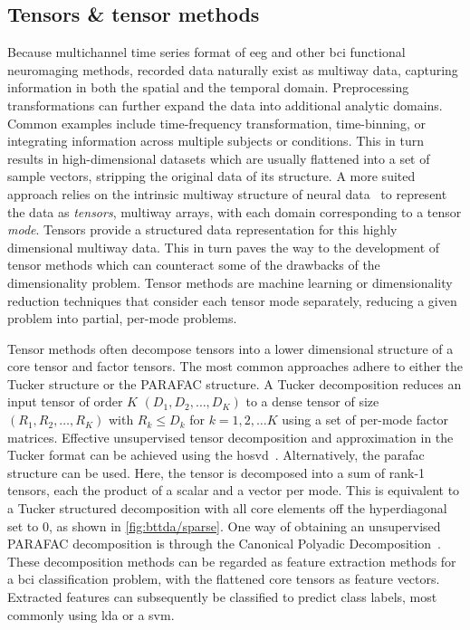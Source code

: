 \documentclass[twocolumn]{article}
\begin{document}
\subsection{Tensors \& tensor methods}

Because multichannel time series format of \ac{eeg} and other \ac{bci} functional
neuromaging methods, recorded data naturally exist as multiway data, capturing
information in both the spatial and the temporal domain.
Preprocessing transformations can further expand the data into additional
analytic domains.
Common examples include time-frequency transformation, time-binning, or
integrating information across multiple subjects or conditions.
This in turn results in high-dimensional datasets which are usually flattened
into a set of sample vectors, stripping the original data of its structure.
A more suited approach relies on the intrinsic multiway structure of neural
data~\cite{Erol2022} to represent the data as \emph{tensors}, multiway arrays,
with each domain corresponding to a tensor \emph{mode}.
Tensors provide a structured data representation for this highly dimensional
multiway data.
This in turn paves the way to the development of tensor methods which can
counteract some of the drawbacks of the dimensionality problem.
Tensor methods are machine learning or dimensionality reduction techniques that
consider each tensor mode separately, reducing a given problem into partial,
per-mode problems.

Tensor methods often decompose tensors into a lower dimensional structure
of a core tensor and factor tensors.
The most common approaches adhere to either the Tucker structure or the PARAFAC
structure.
A Tucker decomposition reduces an input tensor of order $K$  $(D_1,D_2,\ldots,D_K)$ to
a dense tensor of size $(R_1,R_2,\ldots,R_K)$ with $R_k \leq D_k$ for $k=1, 2, \ldots K$ using a
set of per-mode factor matrices.
Effective unsupervised tensor decomposition and approximation in the Tucker format can be achieved
using the \ac{hosvd}~\cite{DeLathauwer2000,SoleCasals2018}.
Alternatively, the \ac{parafac} structure can be used.
Here, the tensor is decomposed into a sum of rank-1 tensors, each the product
of a scalar and a vector per mode.
This is equivalent to a Tucker structured decomposition with all core elements
off the hyperdiagonal set to 0, as shown in \cref{fig:bttda/sparse}.
One way of obtaining an unsupervised PARAFAC decomposition is through the Canonical Polyadic
Decomposition~\cite{Hitchcock1927,Nazarpour2006}.
These decomposition methods can be regarded as feature extraction methods for a
\ac{bci} classification problem, with the flattened core tensors as feature vectors.
Extracted features can subsequently be classified to predict class labels, most
commonly using \ac{lda} or a \ac{svm}.
\end{document}
